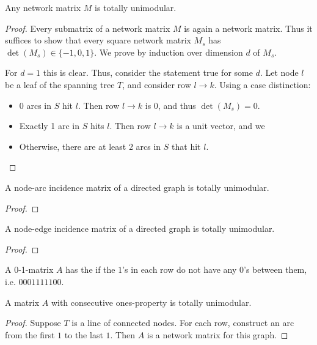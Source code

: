 \begin{theorem}
    Any network matrix $M$ is totally unimodular.
\end{theorem}
\begin{proof}
    Every submatrix of a network matrix $M$ is again a network matrix.
    Thus it suffices to show that every square network matrix $M_s$ has $\det(M_s)\in \{-1,0,1\}$.
    We prove by induction over dimension $d$ of $M_s$.

    For $d=1$ this is clear. Thus, consider the statement true for some $d$.
    Let node $l$ be a leaf of the spanning tree $T$, and consider row $l \rightarrow k$. Using a case distinction:
    \begin{itemize}
        \item 0 arcs in $S$ hit $l$. Then row $l \rightarrow k$ is $0$, and thus $\det(M_s)=0$.
        \item Exactly 1 arc in $S$ hits $l$. Then row $l \rightarrow k$ is a unit vector, and we
        \item Otherwise, there are at least 2 arcs in $S$ that hit $l$.
    \end{itemize}
\end{proof}
\begin{corollary}
    A node-arc incidence matrix of a directed graph is totally unimodular.
\end{corollary}
\begin{proof}

\end{proof}
\begin{corollary}
    A node-edge incidence matrix of a directed graph is totally unimodular.
\end{corollary}
\begin{proof}

\end{proof}
\begin{definition}
    A 0-1-matrix $A$ has the  if the $1$'s in each row
    do not have any $0$'s between them, i.e. $0001111100$.
\end{definition}
\begin{corollary}
    A matrix $A$ with consecutive ones-property is totally unimodular.
\end{corollary}
\begin{proof}
    Suppose $T$ is a line of connected nodes.
    For each row, construct an arc from the first $1$ to the last $1$. Then $A$ is a network matrix for this graph.
\end{proof}
